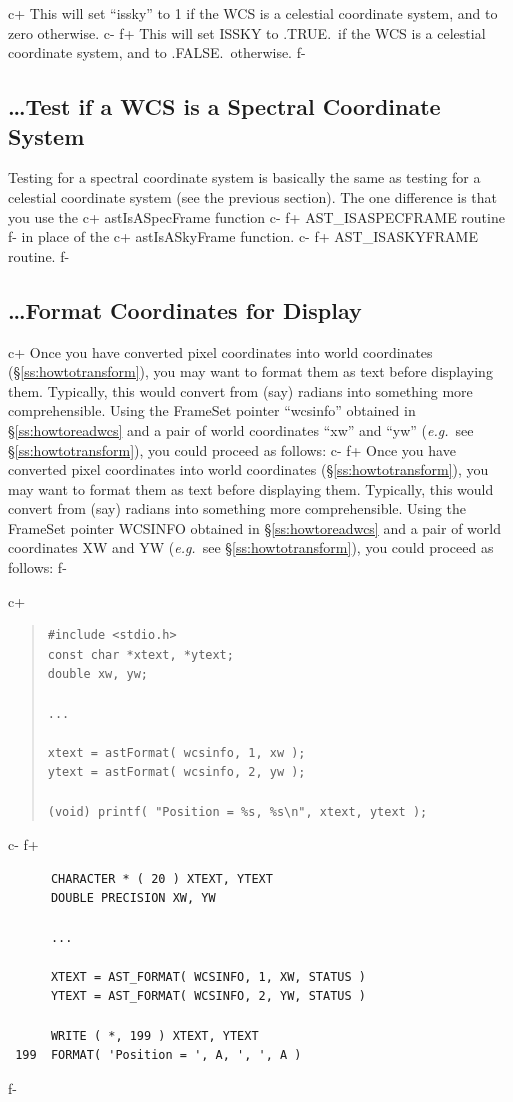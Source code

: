 \documentclass[twoside,11pt]{article}
\newcommand{\secref}[1]{\S\ref{#1}}
\newcommand{\secref}[1]{\ref{#1}}
\begin{document}
c+
This will set ``issky'' to 1 if the WCS is a celestial coordinate
system, and to zero otherwise.
c-
f+
This will set ISSKY to .TRUE.\ if the WCS is a celestial coordinate
system, and to .FALSE.\ otherwise.
f-

\subsection{\label{ss:howtotestforspectral}\ldots Test if a WCS is a Spectral Coordinate System}
Testing for a spectral coordinate system is basically the same as testing
for a celestial coordinate system (see the previous section). The one
difference is that you use the 
c+
astIsASpecFrame function
c-
f+
AST\_ISASPECFRAME routine
f-
in place of the 
c+
astIsASkyFrame function.
c-
f+
AST\_ISASKYFRAME routine.
f-

\subsection{\label{ss:howtoformatcoordinates}\ldots Format Coordinates for Display}

c+
Once you have converted pixel coordinates into world coordinates
(\secref{ss:howtotransform}), you may want to format them as text
before displaying them. Typically, this would convert from (say)
radians into something more comprehensible. Using the FrameSet pointer
``wcsinfo'' obtained in \secref{ss:howtoreadwcs} and a pair of world
coordinates ``xw'' and ``yw'' ({\em{e.g.}}\ see
\secref{ss:howtotransform}), you could proceed as follows:
c-
f+
Once you have converted pixel coordinates into world coordinates
(\secref{ss:howtotransform}), you may want to format them as text
before displaying them. Typically, this would convert from (say)
radians into something more comprehensible. Using the FrameSet pointer
WCSINFO obtained in \secref{ss:howtoreadwcs} and a pair of world
coordinates XW and YW ({\em{e.g.}}\ see \secref{ss:howtotransform}),
you could proceed as follows:
f-

c+
\begin{quote}
\small
\begin{verbatim}
#include <stdio.h>
const char *xtext, *ytext;
double xw, yw;

...

xtext = astFormat( wcsinfo, 1, xw );
ytext = astFormat( wcsinfo, 2, yw );

(void) printf( "Position = %s, %s\n", xtext, ytext );
\end{verbatim}
\normalsize
\end{quote}
c-
f+
\small
\begin{verbatim}
      CHARACTER * ( 20 ) XTEXT, YTEXT
      DOUBLE PRECISION XW, YW

      ...

      XTEXT = AST_FORMAT( WCSINFO, 1, XW, STATUS )
      YTEXT = AST_FORMAT( WCSINFO, 2, YW, STATUS )

      WRITE ( *, 199 ) XTEXT, YTEXT
 199  FORMAT( 'Position = ', A, ', ', A )
\end{verbatim}
\normalsize
f-
\end{document}
